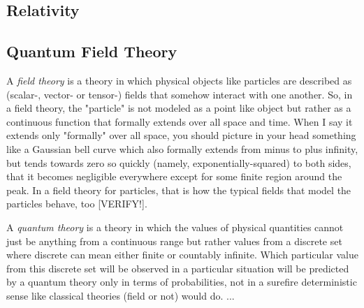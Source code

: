 




\subsection{Relativity}





\subsection{Quantum Field Theory}

A \emph{field theory} is a theory in which physical objects like particles are described as (scalar-, vector- or tensor-) fields that somehow interact with one another. So, in a field theory, the "particle" is not modeled as a point like object but rather as a continuous function that formally extends over all space and time. When I say it extends only "formally" over all space, you should picture in your head something like a Gaussian bell curve which also formally extends from minus to plus infinity, but tends towards zero so quickly (namely, exponentially-squared) to both sides, that it becomes negligible everywhere except for some finite region around the peak. In a field theory for particles, that is how the typical fields that model the particles behave, too [VERIFY!].

\medskip
A \emph{quantum theory} is a theory in which the values of physical quantities cannot just be anything from a continuous range but rather values from a discrete set where discrete can mean either finite or countably infinite. Which particular value from this discrete set will be observed in a particular situation will be predicted by a quantum theory only in terms of probabilities, not in a surefire deterministic sense like classical theories (field or not) would do. ...

